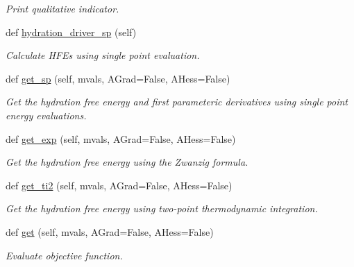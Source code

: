 \begin{DoxyCompactItemize}
\begin{DoxyCompactList}\small\item\em Print qualitative indicator. \end{DoxyCompactList}\item 
def \hyperlink{classsrc_1_1hydration_1_1Hydration_a5de8c3c6f83356cacbaf95c8514f1eb1}{hydration\+\_\+driver\+\_\+sp} (self)
\begin{DoxyCompactList}\small\item\em Calculate H\+F\+Es using single point evaluation. \end{DoxyCompactList}\item 
def \hyperlink{classsrc_1_1hydration_1_1Hydration_aedb0b81f516f946514ec4e1bc4c0f689}{get\+\_\+sp} (self, mvals, A\+Grad=False, A\+Hess=False)
\begin{DoxyCompactList}\small\item\em Get the hydration free energy and first parameteric derivatives using single point energy evaluations. \end{DoxyCompactList}\item 
def \hyperlink{classsrc_1_1hydration_1_1Hydration_a4f0f4e2131130f0c59b1ace29eb78001}{get\+\_\+exp} (self, mvals, A\+Grad=False, A\+Hess=False)
\begin{DoxyCompactList}\small\item\em Get the hydration free energy using the Zwanzig formula. \end{DoxyCompactList}\item 
def \hyperlink{classsrc_1_1hydration_1_1Hydration_a38cd994b0a967cae32096b80c4e630a9}{get\+\_\+ti2} (self, mvals, A\+Grad=False, A\+Hess=False)
\begin{DoxyCompactList}\small\item\em Get the hydration free energy using two-\/point thermodynamic integration. \end{DoxyCompactList}\item 
def \hyperlink{classsrc_1_1hydration_1_1Hydration_adecf668bde832dee5cbb038873bcce57}{get} (self, mvals, A\+Grad=False, A\+Hess=False)
\begin{DoxyCompactList}\small\item\em Evaluate objective function. \end{DoxyCompactList}\end{DoxyCompactItemize}
